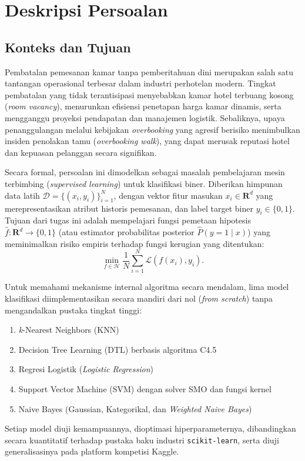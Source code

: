 \section{Deskripsi Persoalan}

\subsection{Konteks dan Tujuan}

Pembatalan pemesanan kamar tanpa pemberitahuan dini merupakan salah satu tantangan operasional
terbesar dalam industri perhotelan modern. Tingkat pembatalan yang tidak terantisipasi menyebabkan
kamar hotel terbuang kosong (\textit{room vacancy}), menurunkan efisiensi penetapan harga kamar dinamis,
serta mengganggu proyeksi pendapatan dan manajemen logistik. Sebaliknya, upaya penanggulangan melalui
kebijakan \textit{overbooking} yang agresif berisiko menimbulkan insiden penolakan tamu (\textit{overbooking walk}),
yang dapat merusak reputasi hotel dan kepuasan pelanggan secara signifikan.

Secara formal, persoalan ini dimodelkan sebagai masalah pembelajaran mesin terbimbing (\textit{supervised learning})
untuk klasifikasi biner. Diberikan himpunan data latih $\mathcal{D} = \{(x_i, y_i)\}_{i=1}^N$, dengan
vektor fitur masukan $x_i \in \mathbf{R}^d$ yang merepresentasikan atribut historis pemesanan, dan
label target biner $y_i \in \{0, 1\}$. Tujuan dari tugas ini adalah mempelajari fungsi pemetaan hipotesis
$\hat{f}: \mathbf{R}^d \to \{0, 1\}$ (atau estimator probabilitas posterior $\hat{P}(y = 1 \mid x)$)
yang meminimalkan risiko empiris terhadap fungsi kerugian yang ditentukan:
\[
\min_{f \in \mathcal{H}} \frac{1}{N} \sum_{i=1}^N \mathcal{L}(f(x_i), y_i) .
\]

Untuk memahami mekanisme internal algoritma secara mendalam, lima model klasifikasi
diimplementasikan secara mandiri dari nol (\textit{from scratch}) tanpa mengandalkan pustaka tingkat tinggi:
\begin{enumerate}
  \item \textit{k}-Nearest Neighbors (KNN)
  \item Decision Tree Learning (DTL) berbasis algoritma C4.5
  \item Regresi Logistik (\textit{Logistic Regression})
  \item Support Vector Machine (SVM) dengan solver SMO dan fungsi kernel
  \item Naive Bayes (Gaussian, Kategorikal, dan \textit{Weighted Naive Bayes})
\end{enumerate}
Setiap model diuji kemampuannya, dioptimasi hiperparameternya, dibandingkan secara kuantitatif
terhadap pustaka baku industri \texttt{scikit-learn}, serta diuji generalisasinya pada platform kompetisi Kaggle.

